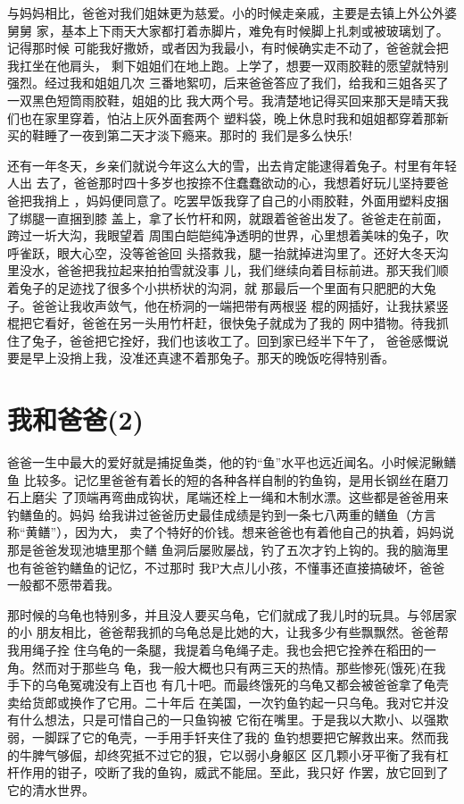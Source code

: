 \documentclass[12pt]{book}
\begin{document}
与妈妈相比，爸爸对我们姐妹更为慈爱。小的时候走亲戚，主要是去镇上外公外婆舅舅
家，基本上下雨天大家都打着赤脚片，难免有时候脚上扎刺或被玻璃划了。记得那时候
可能我好撒娇，或者因为我最小，有时候确实走不动了，爸爸就会把我扛坐在他肩头，
剩下姐姐们在地上跑。上学了，想要一双雨胶鞋的愿望就特别强烈。经过我和姐姐几次
三番地絮叨，后来爸爸答应了我们，给我和三姐各买了一双黑色短筒雨胶鞋，姐姐的比
我大两个号。我清楚地记得买回来那天是晴天我们也在家里穿着，怕沾上灰外面套两个
塑料袋，晚上休息时我和姐姐都穿着那新买的鞋睡了一夜到第二天才淡下瘾来。那时的
我们是多么快乐!

还有一年冬天，乡亲们就说今年这么大的雪，出去肯定能逮得着兔子。村里有年轻人出
去了，爸爸那时四十多岁也按捺不住蠢蠢欲动的心，我想着好玩儿坚持要爸爸把我捎上
，妈妈便同意了。吃罢早饭我穿了自己的小雨胶鞋，外面用塑料皮捆了绑腿一直捆到膝
盖上，拿了长竹杆和网，就跟着爸爸出发了。爸爸走在前面，跨过一圻大沟，我眼望着
周围白皑皑纯净透明的世界，心里想着美味的兔子，吹呼雀跃，眼大心空，没等爸爸回
头搭救我，腿一抬就掉进沟里了。还好大冬天沟里没水，爸爸把我拉起来拍拍雪就没事
儿，我们继续向着目标前进。那天我们顺着兔子的足迹找了很多个小拱桥状的沟洞，就
那最后一个里面有只肥肥的大兔子。爸爸让我收声敛气，他在桥洞的一端把带有两根竖
棍的网插好，让我扶紧竖棍把它看好，爸爸在另一头用竹杆赶，很快兔子就成为了我的
网中猎物。待我抓住了兔子，爸爸把它拴好，我们也该收工了。回到家已经半下午了，
爸爸感慨说要是早上没捎上我，没准还真逮不着那兔子。那天的晚饭吃得特别香。
\section{我和爸爸(2)}
\label{sec-9-6}

爸爸一生中最大的爱好就是捕捉鱼类，他的钓“鱼”水平也远近闻名。小时候泥鳅鳝鱼
比较多。记忆里爸爸有着长的短的各种各样自制的钓鱼钩，是用长钢丝在磨刀石上磨尖
了顶端再弯曲成钩状，尾端还栓上一绳和木制水漂。这些都是爸爸用来钓鳝鱼的。妈妈
给我讲过爸爸历史最佳成绩是钓到一条七八两重的鳝鱼（方言称“黄鳝”），因为大，
卖了个特好的价钱。想来爸爸也有着他自己的执着，妈妈说那是爸爸发现池塘里那个鳝
鱼洞后屡败屡战，钓了五次才钓上钩的。我的脑海里也有爸爸钓鳝鱼的记忆，不过那时
我P大点儿小孩，不懂事还直接搞破坏，爸爸一般都不愿带着我。

那时候的乌龟也特别多，并且没人要买乌龟，它们就成了我儿时的玩具。与邻居家的小
朋友相比，爸爸帮我抓的乌龟总是比她的大，让我多少有些飘飘然。爸爸帮我用绳子拴
住乌龟的一条腿，我提着乌龟绳子走。我也会把它拴养在稻田的一角。然而对于那些乌
龟，我一般大概也只有两三天的热情。那些惨死(饿死)在我手下的乌龟冤魂没有上百也
有几十吧。而最终饿死的乌龟又都会被爸爸拿了龟壳卖给货郎或换作了它用。二十年后
在美国，一次钓鱼钓起一只乌龟。我对它并没有什么想法，只是可惜自己的一只鱼钩被
它衔在嘴里。于是我以大欺小、以强欺弱，一脚踩了它的龟壳，一手用手钎夹住了我的
鱼钓想要把它解救出来。然而我的牛脾气够倔，却终究抵不过它的狠，它以弱小身躯区
区几颗小牙平衡了我有杠杆作用的钳子，咬断了我的鱼钩，威武不能屈。至此，我只好
作罢，放它回到了它的清水世界。
\end{document}
